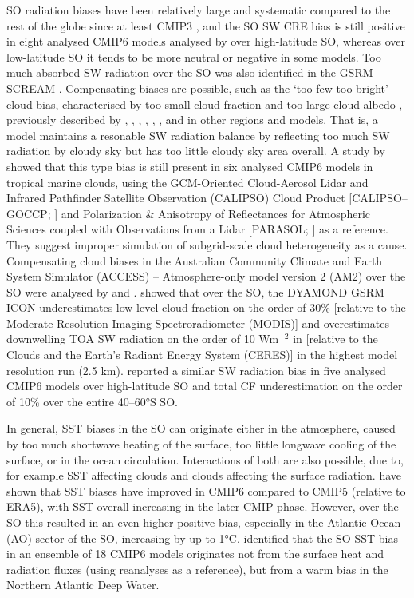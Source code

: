 \documentclass[12pt,a4paper]{article}
\begin{document}
SO radiation biases have been relatively large and systematic compared to the
rest of the globe since at least CMIP3 \citep{trenberth2010}, and the SO SW CRE
bias is still positive in eight analysed CMIP6 models analysed by
\cite{schuddeboom2021} over high-latitude SO, whereas over low-latitude SO it
tends to be more neutral or negative in some models. Too much absorbed SW
radiation over the SO was also identified in the GSRM SCREAM
\cite{caldwell2021}. Compensating biases are possible, such as the `too few too
bright' cloud bias, characterised by too small cloud fraction and too large
cloud albedo \citep{wall2017,kuma2020}, previously described by
\cite{webb2001}, \cite{weare2004}, \cite{zhang2005}, \cite{karlsson2008},
\cite{nam2012}, \cite{klein2013}, and \cite{bender2017} in other regions and
models. That is, a model maintains a resonable SW radiation balance by
reflecting too much SW radiation by cloudy sky but has too little cloudy sky
area overall. A study by \cite{konsta2022} showed that this type bias is still
present in six analysed CMIP6 models in tropical marine clouds, using the
GCM-Oriented Cloud-Aerosol Lidar and Infrared Pathfinder Satellite Observation
(CALIPSO) Cloud Product [CALIPSO--GOCCP; \cite{chepfer2010}] and Polarization
\& Anisotropy of Reflectances for Atmospheric Sciences coupled with
Observations from a Lidar [PARASOL; \citep{lier2008}] as a reference. They
suggest improper simulation of subgrid-scale cloud heterogeneity as a cause.
Compensating cloud biases in the Australian Community Climate and Earth System
Simulator (ACCESS) – Atmosphere-only model version 2 (AM2) over the SO were
analysed by \cite{fiddes2022} and \cite{fiddes2024}.  \cite{possner2022} showed
that over the SO, the DYAMOND GSRM ICON underestimates low-level cloud fraction
on the order of 30\% [relative to the Moderate Resolution Imaging
Spectroradiometer (MODIS)] and overestimates downwelling TOA SW radiation on
the order of 10 Wm$^\mathrm{-2}$ in  [relative to the Clouds and the Earth’s
Radiant Energy System (CERES)] in the highest model resolution run (2.5 km).
\cite{zhao2022} reported a similar SW radiation bias in five analysed CMIP6
models over high-latitude SO and total CF underestimation on the order of 10\%
over the entire 40--60°S SO.

In general, SST biases in the SO can originate either in the atmosphere, caused
by too much shortwave heating of the surface, too little longwave cooling of
the surface, or in the ocean circulation.  Interactions of both are also
possible, due to, for example SST affecting clouds and clouds affecting the
surface radiation.  \cite{zhang2023} have shown that SST biases have improved
in CMIP6 compared to CMIP5 (relative to ERA5), with SST overall increasing in
the later CMIP phase. However, over the SO this resulted in an even higher
positive bias, especially in the Atlantic Ocean (AO) sector of the SO,
increasing by up to 1°C.  \cite{luo2023} identified that the SO SST bias in an
ensemble of 18 CMIP6 models originates not from the surface heat and radiation
fluxes (using reanalyses as a reference), but from a warm bias in the Northern
Atlantic Deep Water.
\end{document}
